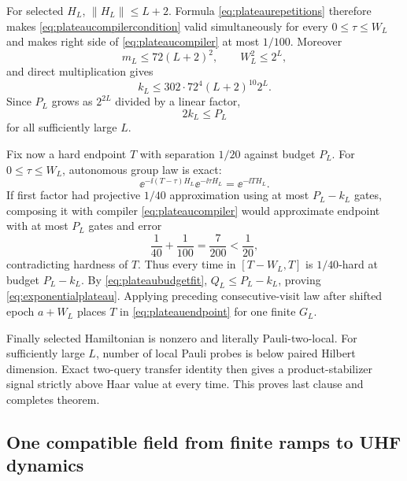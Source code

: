 For selected $H_L$, $\|H_L\|\le L+2$.  Formula
\eqref{eq:plateaurepetitions} therefore makes
\eqref{eq:plateaucompilercondition} valid simultaneously for every
$0\le\tau\le W_L$ and makes right side of
\eqref{eq:plateaucompiler} at most $1/100$.  Moreover
\begin{equation}
 m_L\le72(L+2)^2,\qquad W_L^2\le2^L,
\end{equation}
and direct multiplication gives
\begin{equation}
 k_L\le302\cdot72^4(L+2)^{10}2^L.                  \label{eq:plateaucostbound}
\end{equation}
Since $P_L$ grows as $2^{2L}$ divided by a linear factor,
\begin{equation}
 2k_L\le P_L                                        \label{eq:plateaubudgetfit}
\end{equation}
for all sufficiently large $L$.

Fix now a hard endpoint $T$ with separation $1/20$ against budget $P_L$.
For $0\le\tau\le W_L$, autonomous group law is exact:
\begin{equation}
 \ee^{-\ii(T-\tau)H_L}\ee^{-\ii\tau H_L}
 =\ee^{-\ii TH_L}.                                  \label{eq:plateaugroup}
\end{equation}
If first factor had projective $1/40$ approximation using at most
$P_L-k_L$ gates, composing it with compiler
\eqref{eq:plateaucompiler} would approximate endpoint with at most $P_L$
gates and error
\begin{equation}
 \frac1{40}+\frac1{100}=\frac7{200}<\frac1{20},
\end{equation}
contradicting hardness of $T$.  Thus every time in $[T-W_L,T]$ is
$1/40$-hard at budget $P_L-k_L$.  By
\eqref{eq:plateaubudgetfit}, $Q_L\le P_L-k_L$, proving
\eqref{eq:exponentialplateau}.  Applying preceding consecutive-visit law
after shifted epoch $a+W_L$ places $T$ in
\eqref{eq:plateauendpoint} for one finite $G_L$.

Finally selected Hamiltonian is nonzero and literally Pauli-two-local.
For sufficiently large $L$, number of local Pauli probes is below paired
Hilbert dimension.  Exact two-query transfer identity then gives a
product-stabilizer signal strictly above Haar value at every time.  This
proves last clause and completes theorem.

\subsection{One compatible field from finite ramps to UHF dynamics}

